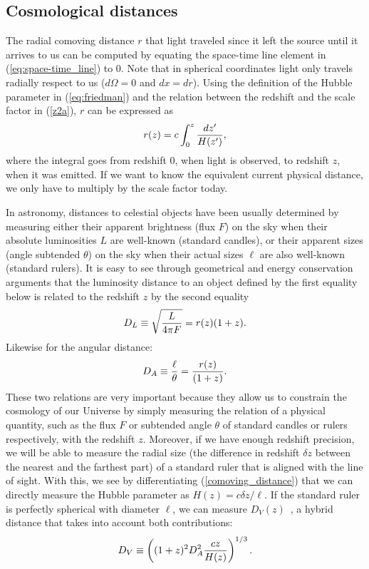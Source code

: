 \subsection{Cosmological distances}
\label{sec:distances}
The radial comoving distance $r$ that light traveled since it left the source until it arrives to us can be computed by equating the space-time line element in (\ref{eq:space-time_line}) to 0. Note that in spherical coordinates light only travels radially respect to us ($d\Omega = 0$ and $dx = dr$). Using the definition of the Hubble parameter in (\ref{eq:friedman}) and the relation between the redshift and the scale factor in (\ref{z2a}), $r$ can be expressed as 
\begin{equation}
r(z) = c \int_0^{z} {dz' \over H(z')},
\label{comoving_distance}
\end{equation}
where the integral goes from redshift 0, when light is observed, to redshift $z$, when it was emitted. If we want to know the equivalent current physical distance, we only have to multiply by the scale factor today.

In astronomy, distances to celestial objects have been usually determined by measuring either their apparent brightness (flux $F$) on the sky when their absolute luminosities $L$ are well-known (standard candles), or their apparent sizes (angle subtended $\theta$) on the sky when their actual sizes $\ell$ are also well-known (standard rulers). It is easy to see through geometrical and energy conservation arguments that the luminosity distance to an object defined by the first equality below is related to the redshift $z$ by the second equality 
\begin{equation}
D_L \equiv \sqrt{L \over 4 \pi F}  = r(z) (1+z).
\label{eq:DL}
\end{equation}
Likewise for the angular distance:
\begin{equation}
D_A \equiv {\ell \over \theta} = {r(z) \over (1+z)}.
\label{eq:DA}
\end{equation}
These two relations are very important because they allow us to constrain the cosmology of our Universe by simply measuring the relation of a physical quantity, such as the flux $F$ or subtended angle $\theta$ of standard candles or rulers respectively, with the redshift $z$. Moreover, if we have enough redshift precision, we will be able to measure the radial size (the difference in redshift $\delta z$ between the nearest and the farthest part) of a standard ruler that is aligned with the line of sight. With this, we see by differentiating (\ref{comoving_distance}) that we can directly measure the Hubble parameter as $H(z) = c \delta z / \ell$. If the standard ruler is perfectly spherical with diameter $\ell$, we can measure $D_V(z)$~\citep{Eisenstein2005}, a hybrid distance that takes into account both contributions:
\begin{equation}
D_V \equiv \left((1+z)^2 D_A^2 {cz \over H(z)} \right)^{1/3}.
\label{eq:DV}
\end{equation}

